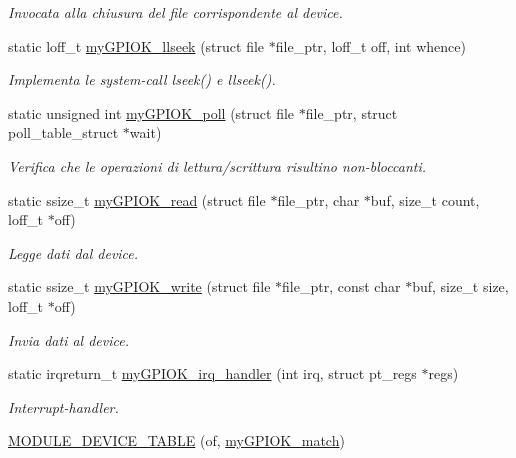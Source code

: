 \begin{DoxyCompactItemize}
\begin{DoxyCompactList}\small\item\em Invocata alla chiusura del file corrispondente al device. \end{DoxyCompactList}\item 
static loff\+\_\+t \hyperlink{group___linux-_driver_ga66e7f726b72320a272b633ecbaecefff}{my\+G\+P\+I\+O\+K\+\_\+llseek} (struct file $\ast$file\+\_\+ptr, loff\+\_\+t off, int whence)
\begin{DoxyCompactList}\small\item\em Implementa le system-\/call lseek() e llseek(). \end{DoxyCompactList}\item 
static unsigned int \hyperlink{group___linux-_driver_gaba935e8a8215c2ebce9a7147fd4f5147}{my\+G\+P\+I\+O\+K\+\_\+poll} (struct file $\ast$file\+\_\+ptr, struct poll\+\_\+table\+\_\+struct $\ast$wait)
\begin{DoxyCompactList}\small\item\em Verifica che le operazioni di lettura/scrittura risultino non-\/bloccanti. \end{DoxyCompactList}\item 
static ssize\+\_\+t \hyperlink{group___linux-_driver_ga90ac339df9c02ae5f11a2a7727adc923}{my\+G\+P\+I\+O\+K\+\_\+read} (struct file $\ast$file\+\_\+ptr, char $\ast$buf, size\+\_\+t count, loff\+\_\+t $\ast$off)
\begin{DoxyCompactList}\small\item\em Legge dati dal device. \end{DoxyCompactList}\item 
static ssize\+\_\+t \hyperlink{group___linux-_driver_ga1eea0f6c86e8966ba9b701da57502aad}{my\+G\+P\+I\+O\+K\+\_\+write} (struct file $\ast$file\+\_\+ptr, const char $\ast$buf, size\+\_\+t size, loff\+\_\+t $\ast$off)
\begin{DoxyCompactList}\small\item\em Invia dati al device. \end{DoxyCompactList}\item 
static irqreturn\+\_\+t \hyperlink{group___linux-_driver_ga2fc230a12a97aa63e43b2dc4aec73511}{my\+G\+P\+I\+O\+K\+\_\+irq\+\_\+handler} (int irq, struct pt\+\_\+regs $\ast$regs)
\begin{DoxyCompactList}\small\item\em Interrupt-\/handler. \end{DoxyCompactList}\item 
\hyperlink{group___linux-_driver_gaf33e020610cd80a1cfa2ed79b512b841}{M\+O\+D\+U\+L\+E\+\_\+\+D\+E\+V\+I\+C\+E\+\_\+\+T\+A\+B\+LE} (of, \hyperlink{group___linux-_driver_gab59f49dc0fe8d885c73752b8a8163d0e}{my\+G\+P\+I\+O\+K\+\_\+match})

\end{DoxyCompactItemize}
